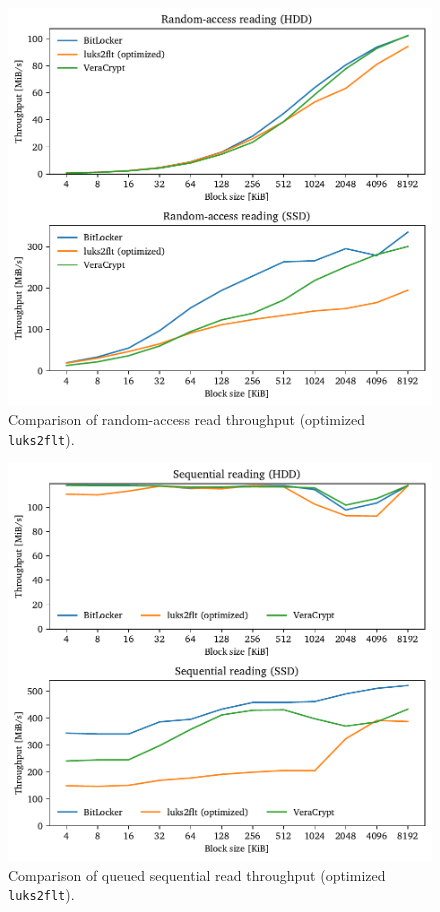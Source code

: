 \begin{figure}[htb!]
	\center
	\includegraphics[scale=1]{../fig/performance.hwexperiments.optrand.pdf}
	\caption[
		Comparison of random-access read throughput (optimized \texttt{luks2flt})
	]{
		Comparison of random-access read throughput (optimized \texttt{luks2flt}). 
	}
	\label{fig:performance.hwexperiments.optrand}
\end{figure}

\begin{figure}[htb!]
	\center
	\includegraphics[scale=1]{../fig/performance.hwexperiments.optseqqueue.pdf}
	\caption[
		Comparison of queued sequential read throughput (optimized \texttt{luks2flt})
	]{
		Comparison of queued sequential read throughput (optimized \texttt{luks2flt}). 
	}
	\label{fig:performance.hwexperiments.optseqqueue}
\end{figure}

